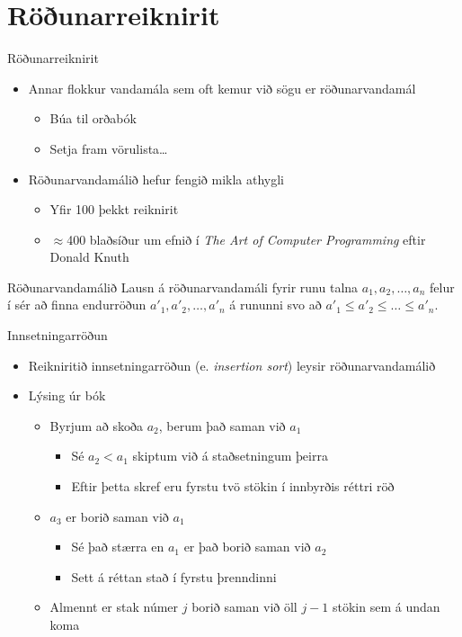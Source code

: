 \documentclass{beamer}
\begin{document}
\section{Röðunarreiknirit}

\begin{frame}{Röðunarreiknirit}
\begin{itemize}
 \item Annar flokkur vandamála sem oft kemur við sögu er röðunarvandamál
 \begin{itemize}
  \item Búa til orðabók
  \item Setja fram vörulista\ldots
 \end{itemize}
 \item Röðunarvandamálið hefur fengið mikla athygli
 \begin{itemize}
  \item Yfir 100 þekkt reiknirit
  \item $\approx$400 blaðsíður um efnið í \emph{The Art of Computer Programming} eftir Donald Knuth
 \end{itemize}
\end{itemize}
\end{frame}

\begin{frame}{Röðunarvandamálið}
Lausn á röðunarvandamáli fyrir runu talna $a_1, a_2, \ldots, a_n$ felur í sér að finna endurröðun $a'_1, a'_2, \ldots, a'_n$ á rununni svo að $a'_1 \leq a'_2 \leq \ldots \leq a'_n$.
\end{frame}


\begin{frame}{Innsetningarröðun}
\begin{itemize}
 \item Reikniritið innsetningarröðun (e. \emph{insertion sort}) leysir röðunarvandamálið
 \item Lýsing úr bók
 \begin{itemize}
  \item Byrjum að skoða $a_2$, berum það saman við $a_1$
  \begin{itemize}
   \item Sé $a_2 < a_1$ skiptum við á staðsetningum þeirra
   \item Eftir þetta skref eru fyrstu tvö stökin í innbyrðis réttri röð
  \end{itemize}
  \item $a_3$ er borið saman við $a_1$
  \begin{itemize}
   \item Sé það stærra en $a_1$ er það borið saman við $a_2$
   \item Sett á réttan stað í fyrstu þrenndinni
  \end{itemize}
  \item Almennt er stak númer $j$ borið saman við öll $j-1$ stökin sem á undan koma
 \end{itemize}
\end{itemize}
\end{frame}
\end{document}
